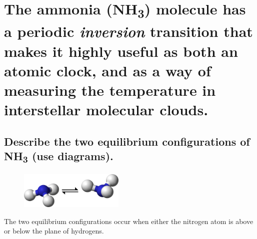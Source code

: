 \documentclass[a4paper]{scrartcl}
\begin{document}
\section{The ammonia (NH\textsubscript{3}) molecule has a periodic \emph{inversion} transition that makes it highly useful as both an atomic clock, and as a way of measuring the temperature in interstellar molecular clouds.}
\subsection{Describe the two equilibrium configurations of NH\textsubscript{3} (use diagrams).}
\begin{figure}
    \centering
    \vspace{-1cm}
    \includegraphics[width = 5cm]{ammonia-inversion.png}
\end{figure}
The two equilibrium configurations occur when either the nitrogen atom is above or below the plane of hydrogens.
\end{document}
